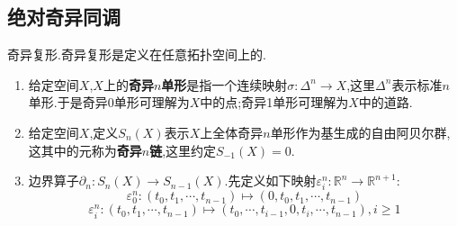 \newpage
\subsection{绝对奇异同调}

奇异复形.奇异复形是定义在任意拓扑空间上的.
\begin{enumerate}
	\item 给定空间$X$,$X$上的\textbf{奇异$n$单形}是指一个连续映射$\sigma:\Delta^n\to X$,这里$\Delta^n$表示标准$n$单形.于是奇异0单形可理解为$X$中的点;奇异1单形可理解为$X$中的道路.
	\item 给定空间$X$,定义$S_n(X)$表示$X$上全体奇异$n$单形作为基生成的自由阿贝尔群,这其中的元称为\textbf{奇异$n$链},这里约定$S_{-1}(X)=0$.
	\item 边界算子$\partial_n:S_n(X)\to S_{n-1}(X)$.先定义如下映射$\varepsilon_i^n:\mathbb{R}^n\to\mathbb{R}^{n+1}$:
	$$\varepsilon_0^n:(t_0,t_1,\cdots,t_{n-1})\mapsto(0,t_0,t_1,\cdots,t_{n-1})$$
	$$\varepsilon_i^n:(t_0,t_1,\cdots,t_{n-1})\mapsto(t_0,\cdots,t_{i-1},0,t_i,\cdots,t_{n-1}),i\ge1$$
	

\end{enumerate}
